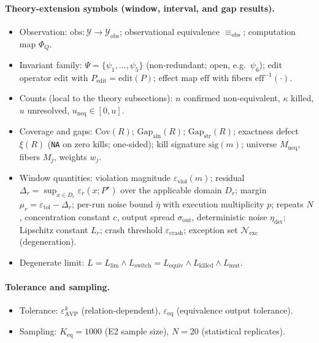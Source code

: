 \documentclass[manuscript,screen,review]{acmart}
\begin{document}
\paragraph{Theory-extension symbols (window, interval, and gap results).}
\begin{itemize}
\item Observation: $\mathrm{obs} : \mathcal{Y} \to \mathcal{Y}_{\mathrm{obs}}$; observational equivalence $\equiv_{\mathrm{obs}}$; computation map $\Phi_Q$.
\item Invariant family: $\Psi = \{\psi_1, \dots, \psi_5\}$ (non-redundant; open, e.g.\ $\psi_6$); edit operator $\mathrm{edit}$ with $P_{\mathrm{edit}} = \mathrm{edit}(P)$; effect map $\mathrm{eff}$ with fibers $\mathrm{eff}^{-1}(\cdot)$.
\item Counts (local to the theory subsections): $n$ confirmed non-equivalent, $\kappa$ killed, $u$ unresolved, $u_{\mathrm{neq}} \in [0, u]$.
\item Coverage and gaps: $\mathrm{Cov}(R)$; $\mathrm{Gap}_{\mathrm{aln}}(R)$; $\mathrm{Gap}_{\mathrm{str}}(R)$; exactness defect $\xi(R)$ (\texttt{NA} on zero kills; one-sided); kill signature $\mathrm{sig}(m)$; universe $M_{\mathrm{neq}}$, fibers $M_j$, weights $w_j$.
\item Window quantities: violation magnitude $\varepsilon_{\mathrm{viol}}(m)$; residual $\Delta_r = \sup_{x \in D_r} \varepsilon_r(x; P^\star)$ over the applicable domain $D_r$; margin $\mu_r = \varepsilon_{\mathrm{tol}} - \Delta_r$; per-run noise bound $\bar\eta$ with execution multiplicity $p$; repeats $N$, concentration constant $c$, output spread $\sigma_{\mathrm{out}}$, deterministic noise $\eta_{\mathrm{det}}$; Lipschitz constant $L_r$; crash threshold $\varepsilon_{\mathrm{crash}}$; exception set $\mathcal{N}_{\mathrm{exc}}$ (degeneration).
\item Degenerate limit: $L = L_{\mathrm{lim}} \wedge L_{\mathrm{switch}} = L_{\mathrm{equiv}} \wedge L_{\mathrm{killed}} \wedge L_{\mathrm{mut}}$.
\end{itemize}

\paragraph{Tolerance and sampling.}
\begin{itemize}
\item Tolerance: $\varepsilon_{\mathrm{AVP}}^k$ (relation-dependent), $\varepsilon_{\mathrm{eq}}$ (equivalence output tolerance).
\item Sampling: $K_{\mathrm{eq}} = 1000$ (E2 sample size), $N = 20$ (statistical replicates).
\end{itemize}
\end{document}
